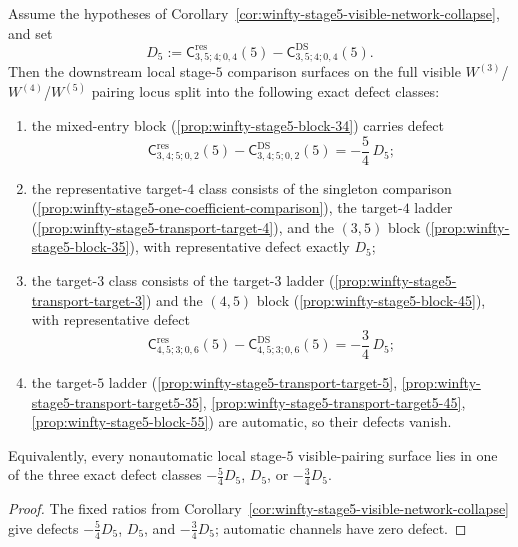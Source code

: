 \begin{corollary}
\label{cor:winfty-stage5-visible-defect-classes}
\ClaimStatusConditional
Assume the hypotheses of
Corollary~\ref{cor:winfty-stage5-visible-network-collapse},
and set
\[
D_5:=
\mathsf{C}^{\mathrm{res}}_{3,5;4;0,4}(5)
-
\mathsf{C}^{\mathrm{DS}}_{3,5;4;0,4}(5).
\]
Then the downstream local stage-$5$ comparison surfaces on the full
visible
\texorpdfstring{$W^{(3)}$}{W3}/\texorpdfstring{$W^{(4)}$}{W4}/\texorpdfstring{$W^{(5)}$}{W5}
pairing locus split into the following exact defect classes:
\begin{enumerate}[label=\textup{(\roman*)}]
\item the mixed-entry block
 \textup{(}\ref{prop:winfty-stage5-block-34}\textup{)} carries defect
 \[
 \mathsf{C}^{\mathrm{res}}_{3,4;5;0,2}(5)
 -
 \mathsf{C}^{\mathrm{DS}}_{3,4;5;0,2}(5)
 =
 -\frac{5}{4}\,D_5;
 \]
\item the representative target-$4$ class consists of the singleton
 comparison \textup{(}\ref{prop:winfty-stage5-one-coefficient-comparison}\textup{)},
 the target-$4$ ladder \textup{(}\ref{prop:winfty-stage5-transport-target-4}\textup{)}, and the
 \texorpdfstring{$(3,5)$}{(3,5)} block
 \textup{(}\ref{prop:winfty-stage5-block-35}\textup{)}, with representative
 defect exactly \(D_5\);
\item the target-$3$ class consists of the target-$3$ ladder
 \textup{(}\ref{prop:winfty-stage5-transport-target-3}\textup{)} and the
 \texorpdfstring{$(4,5)$}{(4,5)} block
 \textup{(}\ref{prop:winfty-stage5-block-45}\textup{)}, with representative
 defect
 \[
 \mathsf{C}^{\mathrm{res}}_{4,5;3;0,6}(5)
 -
 \mathsf{C}^{\mathrm{DS}}_{4,5;3;0,6}(5)
 =
 -\frac{3}{4}\,D_5;
 \]
\item the target-$5$ ladder
 \textup{(}\ref{prop:winfty-stage5-transport-target-5},
 \ref{prop:winfty-stage5-transport-target5-35},
 \ref{prop:winfty-stage5-transport-target5-45},
 \ref{prop:winfty-stage5-block-55}\textup{)}
 are automatic, so their defects vanish.
\end{enumerate}
Equivalently, every nonautomatic local stage-$5$ visible-pairing
surface lies in one of the three exact defect classes
\(-\tfrac54 D_5\), \(D_5\), or \(-\tfrac34 D_5\).
\end{corollary}

\begin{proof}
The fixed ratios from Corollary~\ref{cor:winfty-stage5-visible-network-collapse} give defects \(-\tfrac54 D_5\), \(D_5\), and \(-\tfrac34 D_5\); automatic channels have zero defect.
\end{proof}

